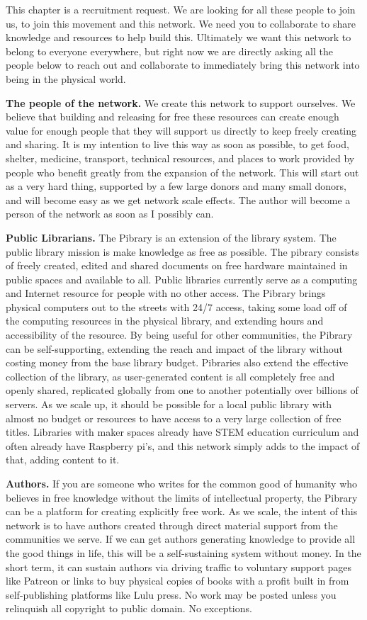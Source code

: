 This chapter is a recruitment request. We are looking for all these
people to join us, to join this movement and this network. We need you
to collaborate to share knowledge and resources to help build this.
Ultimately we want this network to belong to everyone everywhere, but
right now we are directly asking all the people below to reach out and
collaborate to immediately bring this network into being in the physical
world.

\textbf{The people of the network.} We create this network to support
ourselves. We believe that building and releasing for free these
resources can create enough value for enough people that they will
support us directly to keep freely creating and sharing. It is my
intention to live this way as soon as possible, to get food, shelter,
medicine, transport, technical resources, and places to work provided by
people who benefit greatly from the expansion of the network. This will
start out as a very hard thing, supported by a few large donors and many
small donors, and will become easy as we get network scale effects. The
author will become a person of the network as soon as I possibly can.

\textbf{Public Librarians.} The Pibrary is an extension of the library
system. The public library mission is make knowledge as free as
possible. The pibrary consists of freely created, edited and shared
documents on free hardware maintained in public spaces and available to
all. Public libraries currently serve as a computing and Internet
resource for people with no other access. The Pibrary brings physical
computers out to the streets with 24/7 access, taking some load off of
the computing resources in the physical library, and extending hours and
accessibility of the resource. By being useful for other communities,
the Pibrary can be self-supporting, extending the reach and impact of
the library without costing money from the base library budget.
Pibraries also extend the effective collection of the library, as
user-generated content is all completely free and openly shared,
replicated globally from one to another potentially over billions of
servers. As we scale up, it should be possible for a local public
library with almost no budget or resources to have access to a very
large collection of free titles. Libraries with maker spaces already
have STEM education curriculum and often already have Raspberry pi's,
and this network simply adds to the impact of that, adding content to
it.

\textbf{Authors.} If you are someone who writes for the common good of
humanity who believes in free knowledge without the limits of
intellectual property, the Pibrary can be a platform for creating
explicitly free work. As we scale, the intent of this network is to have
authors created through direct material support from the communities we
serve. If we can get authors generating knowledge to provide all the
good things in life, this will be a self-sustaining system without
money. In the short term, it can sustain authors via driving traffic to
voluntary support pages like Patreon or links to buy physical copies of
books with a profit built in from self-publishing platforms like Lulu
press. No work may be posted unless you relinquish all copyright to
public domain. No exceptions.

